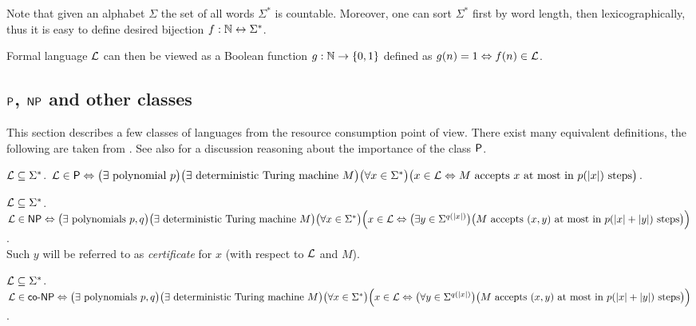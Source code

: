 		\begin{remark}
			Note that given an alphabet $\Sigma$ the set of all words $\Sigma^*$ is countable. Moreover, one can sort $\Sigma^*$ first by word length, then lexicographically, thus it is easy to define desired bijection $f: \N \leftrightarrow \Sigma^* $.
			
			Formal language ${\cal L}$ can then be viewed as a Boolean function $g: \N \rightarrow \{0,1\}$ defined as
			$g(n) = 1 \iff f(n)\in {\cal L}$.
		\end{remark}
		
	
	\subsection{$\P$, $\NP$ and other classes}
	\label{sec:PNP}
		
		This section describes a few classes of languages from the resource consumption point of view. There exist many equivalent definitions, the following are taken from \cite{book_comp}. See also \cite[Chapter 1.5.1]{book_comp} for a discussion reasoning about the importance of the class $\P$.
		
		\begin{defn}\label{def:P}
			${\cal L} \subseteq \Sigma^*$. ${\cal L} \in \P \iff \bigl(\exists \textnormal{ polynomial } p \bigr) \bigl(\exists \textnormal{ deterministic Turing machine } M\bigr)\\ \bigl(\forall x \in \Sigma^*\bigr) \bigl(x \in {\cal L} \iff M \textnormal{ accepts } x \textnormal{ at most in } p(|x|) \textnormal{ steps} \bigr)$.
		\end{defn}
		
		\begin{defn}\label{def:NP}
			${\cal L} \subseteq \Sigma^*$. ${\cal L} \in \NP \iff \bigl(\exists \textnormal{ polynomials } p, q \bigr) \bigl(\exists \textnormal{ deterministic Turing machine } M\bigr)\\ \bigl(\forall x \in \Sigma^*\bigr) \Bigl(x \in {\cal L} \iff \bigl(\exists y \in \Sigma^{q(|x|)}\bigr) \bigl(M \textnormal{ accepts } (x,y) \textnormal{ at most in } p(|x|+|y|) \textnormal{ steps} \bigr)\Bigr)$.\\
			Such $y$ will be referred to as {\em certificate} for $x$ (with respect to $\cal L$ and $M$).
		\end{defn}
		
		\begin{defn}\label{def:coNP}
			${\cal L} \subseteq \Sigma^*$. ${\cal L} \in \coNP \iff \bigl(\exists \textnormal{ polynomials } p, q \bigr) \bigl(\exists \textnormal{ deterministic Turing machine } M\bigr)\\ \bigl(\forall x \in \Sigma^*\bigr) \Bigl(x \in {\cal L} \iff \bigl(\forall y \in \Sigma^{q(|x|)}\bigr) \bigl(M \textnormal{ accepts } (x,y) \textnormal{ at most in } p(|x|+|y|) \textnormal{ steps} \bigr)\Bigr)$.
		\end{defn}
		
